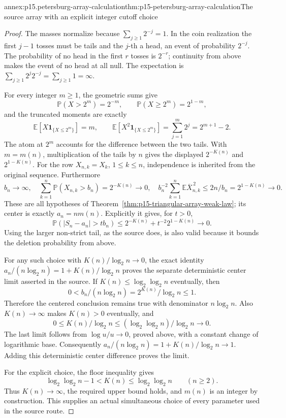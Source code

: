 \begin{annexitem}{annex:p15.petersburg-array-calculation}{thm:p15-petersburg-array-calculation}{The source array with an explicit integer cutoff choice}
\begin{proof}
The masses normalize because \(\sum_{j\geq1}2^{-j}=1\).
In the coin realization the first \(j-1\) tosses must be tails
and the \(j\)-th a head, an event of probability \(2^{-j}\).
The probability of no head in the first \(r\) tosses is \(2^{-r}\);
continuity from above makes the event of no head at all null.
The expectation is
\(\sum_{j\geq1}2^j2^{-j}=\sum_{j\geq1}1=\infty\).

For every integer \(m\geq1\), the geometric sums give
\[
 \mathbb P(X>2^m)=2^{-m},\qquad
 \mathbb P(X\geq2^m)=2^{1-m},
\]
and the truncated moments are exactly
\[
 \mathbb E[X\mathbf1_{\{X\leq2^m\}}]=m,\qquad
 \mathbb E[X^2\mathbf1_{\{X\leq2^m\}}]
       =\sum_{j=1}^m2^j=2^{m+1}-2.
\]
The atom at \(2^m\) accounts for the difference between the
two tails. With \(m=m(n)\), multiplication of the tails by \(n\)
gives the displayed \(2^{-K(n)}\) and \(2^{1-K(n)}\).
For the row \(X_{n,k}=X_k\), \(1\leq k\leq n\),
independence is inherited from the original sequence.
Furthermore
\[
 b_n\to\infty,\quad
 \sum_{k=1}^n\mathbb P(X_{n,k}>b_n)=2^{-K(n)}\to0,\quad
 b_n^{-2}\sum_{k=1}^n\mathbb E\overline X_{n,k}^{\,2}
          \leq 2n/b_n=2^{1-K(n)}\to0.
\]
These are all hypotheses of
Theorem~\ref{thm:p15-triangular-array-weak-law}; its center
is exactly \(a_n=nm(n)\). Explicitly it gives, for \(t>0\),
\[
 \mathbb P(|S_n-a_n|>t b_n)
        \leq2^{-K(n)}+t^{-2}2^{1-K(n)}\longrightarrow0.
\]
Using the larger non-strict tail, as the source does, is also
valid because it bounds the deletion probability from above.

For any such choice with \(K(n)/\log_2n\to0\), the exact identity
\(a_n/(n\log_2n)=1+K(n)/\log_2n\) proves the separate
deterministic center limit asserted in the source.
If \(K(n)\leq\log_2\log_2n\) eventually, then
\[
 0<b_n/(n\log_2n)=2^{K(n)}/\log_2n\leq1.
\]
Therefore the centered conclusion remains true with denominator
\(n\log_2n\). Also \(K(n)\to\infty\) makes \(K(n)>0\)
eventually, and
\[
 0\leq K(n)/\log_2n
       \leq(\log_2\log_2n)/\log_2n\longrightarrow0.
\]
The last limit follows from \(\log u/u\to0\), proved above,
with a constant change of logarithmic base. Consequently
\(a_n/(n\log_2n)=1+K(n)/\log_2n\to1\).
Adding this deterministic center difference proves the limit.

For the explicit choice, the floor inequality gives
\[
 \log_2\log_2n-1<K(n)\leq\log_2\log_2n
                                      \qquad(n\geq2).
\]
Thus \(K(n)\to\infty\), the required upper bound holds, and
\(m(n)\) is an integer by construction. This supplies an actual
simultaneous choice of every parameter used in the source route.


\end{proof}
\end{annexitem}
